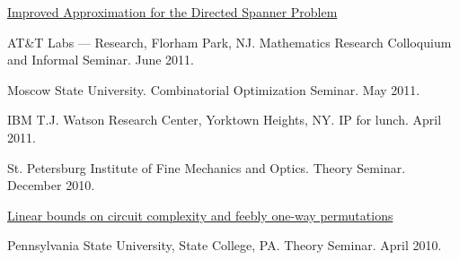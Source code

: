 \documentclass[11pt]{article}
\newenvironment{innerlist}[1][\enskip\textbullet]%
        {\begin{compactitem}[#1]}{\end{compactitem}}
\newcommand{\blankline}{\quad\pagebreak[2]}
\begin{document}
\begin{innerlist}
\item \href{http://grigory.us/files/talks/20110704_Directed_Spanners_ICALP11.pptx}{Improved Approximation for the Directed Spanner Problem}
\begin{innerlist}
  \item AT\&T Labs --- Research, Florham Park, NJ. Mathematics Research Colloquium and Informal Seminar. June 2011.
  \item Moscow State University. Combinatorial Optimization Seminar. May 2011.
  \item IBM T.J. Watson Research Center, Yorktown Heights, NY. IP for lunch. April 2011.
  \item St. Petersburg Institute of Fine Mechanics and Optics. Theory Seminar. December 2010.
\end{innerlist}
\item \href{http://grigory.us/files/talks/penn10.pdf}{Linear bounds on circuit complexity and feebly one-way permutations}
    \begin{innerlist}
      \item Pennsylvania State University, State College, PA. Theory Seminar. April 2010.
    \end{innerlist}
\end{innerlist}
\blankline
\end{document}
